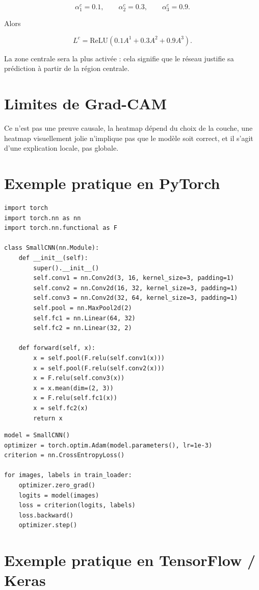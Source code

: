\documentclass[11pt,a4paper]{article}
\begin{document}
\[
\alpha_1^c=0.1,\qquad \alpha_2^c=0.3,\qquad \alpha_3^c=0.9.
\]

Alors

\[
L^c = \mathrm{ReLU}(0.1A^1 + 0.3A^2 + 0.9A^3).
\]

La zone centrale sera la plus activée : cela signifie que le réseau justifie sa prédiction à partir de la région centrale.

\section{Limites de Grad-CAM}

Ce n'est pas une preuve causale, la heatmap dépend du choix de la couche, une heatmap visuellement jolie n'implique pas que le modèle soit correct, et il s'agit d'une explication locale, pas globale.

\section{Exemple pratique en PyTorch}

\begin{lstlisting}
import torch
import torch.nn as nn
import torch.nn.functional as F

class SmallCNN(nn.Module):
    def __init__(self):
        super().__init__()
        self.conv1 = nn.Conv2d(3, 16, kernel_size=3, padding=1)
        self.conv2 = nn.Conv2d(16, 32, kernel_size=3, padding=1)
        self.conv3 = nn.Conv2d(32, 64, kernel_size=3, padding=1)
        self.pool = nn.MaxPool2d(2)
        self.fc1 = nn.Linear(64, 32)
        self.fc2 = nn.Linear(32, 2)

    def forward(self, x):
        x = self.pool(F.relu(self.conv1(x)))
        x = self.pool(F.relu(self.conv2(x)))
        x = F.relu(self.conv3(x))
        x = x.mean(dim=(2, 3))
        x = F.relu(self.fc1(x))
        x = self.fc2(x)
        return x
\end{lstlisting}

\begin{lstlisting}
model = SmallCNN()
optimizer = torch.optim.Adam(model.parameters(), lr=1e-3)
criterion = nn.CrossEntropyLoss()

for images, labels in train_loader:
    optimizer.zero_grad()
    logits = model(images)
    loss = criterion(logits, labels)
    loss.backward()
    optimizer.step()
\end{lstlisting}

\section{Exemple pratique en TensorFlow / Keras}
\end{document}
